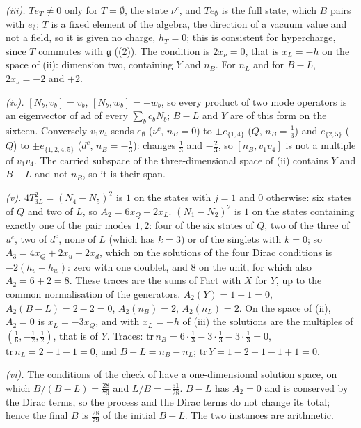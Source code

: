 \emph{(iii).} $T e_{T} \neq 0$ only for $T = \emptyset$, the state $\nu^{c}$, and $T e_{\emptyset}$ is the full state, which $B$ pairs with $e_{\emptyset}$; $T$ is a fixed element of the algebra, the direction of a vacuum value and not a field, so it is given no charge, $h_{T} = 0$; this is consistent for hypercharge, since $T$ commutes with $\mathfrak{g}$ ((2)). The condition is $2x_{\nu} = 0$, that is $x_{L} = -h$ on the space of (ii): dimension two, containing $Y$ and $n_{B}$. For $n_{L}$ and for $B - L$, $2x_{\nu} = -2$ and $+2$.

\emph{(iv).} $[N_{b}, v_{b}] = v_{b}$, $[N_{b}, w_{b}] = -w_{b}$, so every product of two mode operators is an eigenvector of $\mathrm{ad}$ of every $\sum_{b} c_{b}N_{b}$; $B - L$ and $Y$ are of this form on the sixteen. Conversely $v_{1}v_{4}$ sends $e_{\emptyset}$ ($\nu^{c}$, $n_{B} = 0$) to $\pm e_{\{1,4\}}$ ($Q$, $n_{B} = \tfrac13$) and $e_{\{2,5\}}$ ($Q$) to $\pm e_{\{1,2,4,5\}}$ ($d^{c}$, $n_{B} = -\tfrac13$): changes $\tfrac13$ and $-\tfrac23$, so $[n_{B}, v_{1}v_{4}]$ is not a multiple of $v_{1}v_{4}$. The carried subspace of the three-dimensional space of (ii) contains $Y$ and $B - L$ and not $n_{B}$, so it is their span.

\emph{(v).} $4T_{3L}^{2} = (N_{4} - N_{5})^{2}$ is $1$ on the states with $j = 1$ and $0$ otherwise: six states of $Q$ and two of $L$, so $A_{2} = 6x_{Q} + 2x_{L}$. $(N_{1} - N_{2})^{2}$ is $1$ on the states containing exactly one of the pair modes $1, 2$: four of the six states of $Q$, two of the three of $u^{c}$, two of $d^{c}$, none of $L$ (which has $k = 3$) or of the singlets with $k = 0$; so $A_{3} = 4x_{Q} + 2x_{u} + 2x_{d}$, which on the solutions of the four Dirac conditions is $-2(h_{v} + h_{w})$: zero with one doublet, and $8$ on the unit, for which also $A_{2} = 6 + 2 = 8$. These traces are the sums of Fact  with $X$ for $Y$, up to the common normalisation of the generators. $A_{2}(Y) = 1 - 1 = 0$, $A_{2}(B - L) = 2 - 2 = 0$, $A_{2}(n_{B}) = 2$, $A_{2}(n_{L}) = 2$. On the space of (ii), $A_{2} = 0$ is $x_{L} = -3x_{Q}$, and with $x_{L} = -h$ of (iii) the solutions are the multiples of $(\tfrac16, -\tfrac12, \tfrac12)$, that is of $Y$. Traces: $\mathrm{tr}\,n_{B} = 6\cdot\tfrac13 - 3\cdot\tfrac13 - 3\cdot\tfrac13 = 0$, $\mathrm{tr}\,n_{L} = 2 - 1 - 1 = 0$, and $B - L = n_{B} - n_{L}$; $\mathrm{tr}\,Y = 1 - 2 + 1 - 1 + 1 = 0$.

\emph{(vi).} The conditions of the check of  have a one-dimensional solution space, on which $B/(B - L) = \tfrac{28}{79}$ and $L/B = -\tfrac{51}{28}$. $B - L$ has $A_{2} = 0$ and is conserved by the Dirac terms, so the process and the Dirac terms do not change its total; hence the final $B$ is $\tfrac{28}{79}$ of the initial $B - L$. The two instances are arithmetic.

